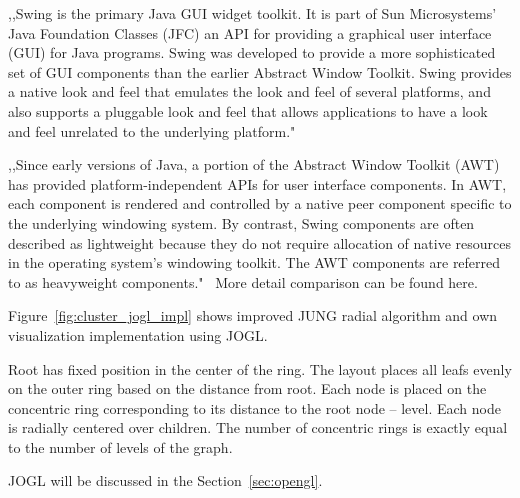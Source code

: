 ,,Swing is the primary Java GUI widget toolkit. It is part of Sun Microsystems' Java Foundation Classes (JFC) an API for providing a graphical user interface (GUI) for Java programs.
Swing was developed to provide a more sophisticated set of GUI components than the earlier Abstract Window Toolkit. Swing provides a native look and feel that emulates the look and feel of several platforms, and also supports a pluggable look and feel that allows applications to have a look and feel unrelated to the underlying platform."~\cite{JAVA_SWING}


,,Since early versions of Java, a portion of the Abstract Window Toolkit (AWT) has provided platform-independent APIs for user interface components. In AWT, each component is rendered and controlled by a native peer component specific to the underlying windowing system.
By contrast, Swing components are often described as lightweight because they do not require allocation of native resources in the operating system's windowing toolkit. The AWT components are referred to as heavyweight components."~\cite{JAVA_SWING} More detail comparison can be found here.~\cite{AWT_VS_SWING}


Figure~\ref{fig:cluster_jogl_impl} shows improved JUNG radial algorithm and own visualization implementation using JOGL.

Root has fixed position in the center of the ring. The layout places all leafs evenly on the outer ring based on the distance from root. Each node is placed on the concentric ring corresponding to its distance to the root node -- level. Each node is radially centered over children. The number of concentric rings is exactly equal to the number of levels of the graph.

JOGL will be discussed in the Section~\ref{sec:opengl}.


